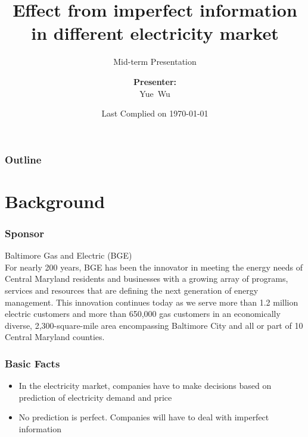\documentclass[compress,handout,10pt]{beamer}
\title{{\color{blue} \LARGE Effect from imperfect information in different electricity market\newline} }
\subtitle{{\color{red} \large Mid-term Presentation} }
\author{ 
    {\bf{Presenter:}} \\ 
Yue~Wu \\ 
    \vspace{5pt}
}
\institute{JHU AMS 2012 FALL}
\date{\mygreen Last Complied on \today}
\let\olditem\item
\renewcommand{\item}{\setlength{\itemsep}{0.5\baselineskip}\olditem}
\begin{document}
\begin{frame}[plain]
    \titlepage
\end{frame}

\begin{frame}
    \frametitle{Outline}
    \tableofcontents
\end{frame}

\section{Background}

\begin{frame}
    \frametitle{Sponsor}
   
    \vspace{7pt}
Baltimore Gas and Electric (BGE)
\\
For nearly 200 years, BGE has been the innovator in meeting the energy needs of Central Maryland residents and businesses with a growing array of programs, services and resources that are defining the next generation of energy management.  This innovation continues today as we serve more than 1.2 million electric customers and more than 650,000 gas customers in an economically diverse, 2,300-square-mile area encompassing Baltimore City and all or part of 10 Central Maryland counties.
 
\end{frame}

\begin{frame}
    \frametitle{Basic Facts}
   
    \vspace{7pt}


             \begin{itemize}
                 \item In the electricity market, companies have to make decisions based on prediction of electricity demand and price
                 \item No prediction is perfect. Companies will have to deal with imperfect information
                
             \end{itemize}


\end{frame}
\end{document}
